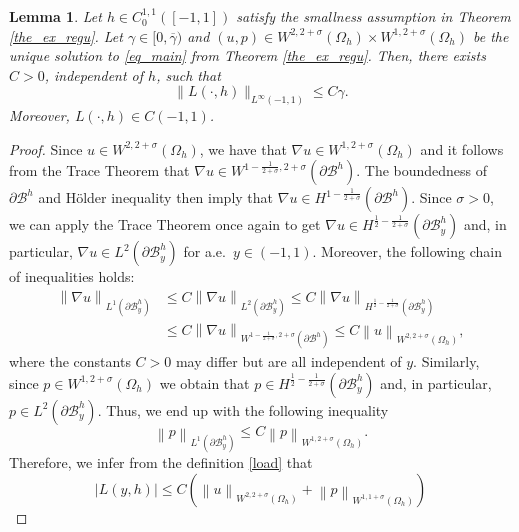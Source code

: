 \documentclass[11pt,a4paper]{amsart}
\newtheorem{lemma}[proposition]{Lemma}
\theoremstyle{remark}
\theoremstyle{definition}
\numberwithin{equation}{section}
\numberwithin{proposition}{section}
\begin{document}
\begin{lemma}\label{lem-Lbound}
Let $h\in C^{1,1}_0([-1,1])$ satisfy the smallness assumption in Theorem \ref{the_ex_regu}. Let $\gamma \in [0, \overline{\gamma})$ and $(u,p)\in W^{2,2+\sigma}(\Omega_h)\times W^{1,2+\sigma}(\Omega_h)$ be the unique solution to \eqref{eq_main} from Theorem \ref{the_ex_regu}. Then, there exists  $C>0$, independent of $h$,  such that
\begin{equation}\label{load-control}
\|L(\cdot, h)\|_{L^\infty(-1,1)}\leq C \gamma .
\end{equation}
Moreover, $L(\cdot, h)\in C(-1,1)$.
\end{lemma}
\begin{proof}
Since $u\in W^{2,2+\sigma}(\Omega_h)$, we have that $\nabla u\in W^{1,2+\sigma}(\Omega_h)$ and it follows from the Trace Theorem  \cite[Theorem 3.37]{McLean2000}  that $\nabla u\in W^{1-\frac{1}{2+\sigma},2+\sigma}(\partial \mathcal{B}^h)$. The boundedness of $\partial \mathcal{B}^h$ and  H\"older inequality then imply that $\nabla u\in H^{1-\frac{1}{2+\sigma}}(\partial \mathcal{B}^h)$. Since $\sigma >0$, we can apply the Trace Theorem once again to get $\nabla u\in H^{\frac{1}{2}-\frac{1}{2+\sigma}}(\partial \mathcal{B}^h_y)$ and, in particular, $\nabla u\in L^2(\partial \mathcal{B}^h_y)$ for a.e.\ $y\in(-1,1)$. Moreover, the following chain of inequalities holds:
\begin{align*}
\left\|\nabla u\right\|_{L^1(\partial \mathcal{B}^h_y)}&\le C\left\|\nabla u\right\|_{L^2(\partial \mathcal{B}^h_y)}\le C\left\|\nabla u\right\|_{H^{\frac{1}{2}-\frac{1}{2+\sigma}}(\partial \mathcal{B}^h_y)}\\
&\le C\left\|\nabla u\right\|_{W^{1-\frac{1}{2+\sigma},2+\sigma}(\partial \mathcal{B}^h)}\le C\left\|u\right\|_{W^{2,2+\sigma}(\Omega_h)},
\end{align*}where the constants $C>0$ may differ but are all independent of $y$.
Similarly, since $p\in W^{1,2+\sigma}(\Omega_h)$ we obtain that $p\in H^{\frac{1}{2}-\frac{1}{2+\sigma}}(\partial \mathcal{B}^h_y)$ and, in particular, $p\in L^2(\partial \mathcal{B}^h_y)$. Thus, we end up with the following inequality
\begin{equation}
\left\|p\right\|_{L^1(\partial \mathcal{B}^h_y)}\le C\left\|p\right\|_{W^{1,2+\sigma}(\Omega_h)}.
\end{equation}
Therefore, we infer from the definition \eqref{load} that
\begin{equation*}
|L(y,h)|\le C\left(\left\|u\right\|_{W^{2,2+\sigma}(\Omega_h)}+\left\|p\right\|_{W^{1,1+\sigma}(\Omega_h)}\right)

\end{equation*}
\end{proof}
\end{document}
